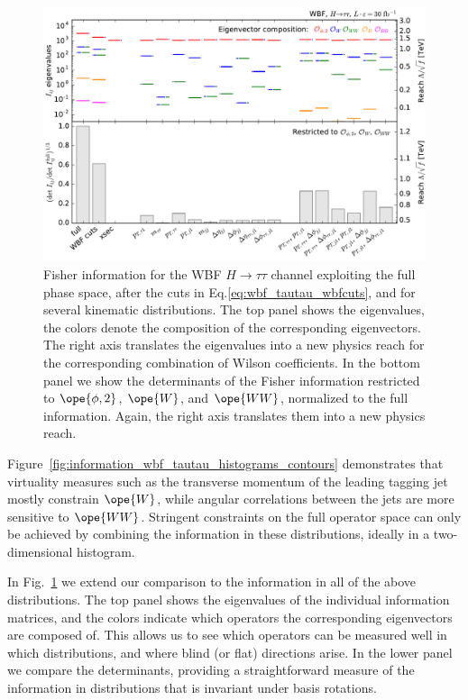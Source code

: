 \begin{figure}[t!]
  \includegraphics[height=0.6 \textwidth]{fig/information/wbf_tautau_histos_comparison}
  \caption{Fisher information for the WBF $H \to \tau \tau$ channel
    exploiting the full phase space, after the cuts in
    Eq.\;\eqref{eq:wbf_tautau_wbfcuts}, and for several kinematic
    distributions.  The top panel shows the eigenvalues, the colors
    denote the composition of the corresponding eigenvectors. The
    right axis translates the eigenvalues into a new physics reach for
    the corresponding combination of Wilson coefficients.  In the
    bottom panel we show the determinants of the Fisher information
    restricted to $\ope{\phi,2}$, $\ope{W}$, and $\ope{WW}$,
    normalized to the full information. Again, the right axis
    translates them into a new physics reach.}
\label{fig:information_wbf_tautau_histograms_comparison}
\end{figure}

Figure~\ref{fig:information_wbf_tautau_histograms_contours} demonstrates that
virtuality measures such as the transverse momentum of the leading
tagging jet mostly constrain $\ope{W}$, while angular correlations
between the jets are more sensitive to $\ope{WW}$. Stringent
constraints on the full operator space can only be achieved by
combining the information in these distributions, ideally in a
two-dimensional histogram.\bigskip

In Fig.~\ref{fig:information_wbf_tautau_histograms_comparison} we extend our
comparison to the information in all of the above distributions. The
top panel shows the eigenvalues of the individual information
matrices, and the colors indicate which operators the corresponding
eigenvectors are composed of. This allows us to see which operators
can be measured well in which distributions, and where blind (or flat)
directions arise. In the lower panel we compare the determinants,
providing a straightforward measure of the information in
distributions that is invariant under basis rotations. 

